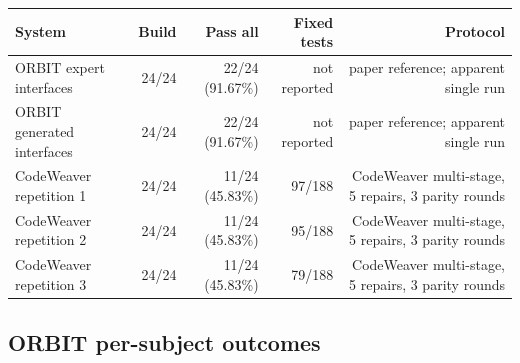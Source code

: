 \documentclass{article}
\begin{document}
\begin{tabular}{lrrrr}
\toprule
System & Build & Pass all & Fixed tests & Protocol \\
\midrule
ORBIT expert interfaces & 24/24 & 22/24 (91.67\%) & not reported & paper reference; apparent single run \\
ORBIT generated interfaces & 24/24 & 22/24 (91.67\%) & not reported & paper reference; apparent single run \\
CodeWeaver repetition 1 & 24/24 & 11/24 (45.83\%) & 97/188 & CodeWeaver multi-stage, 5 repairs, 3 parity rounds \\
CodeWeaver repetition 2 & 24/24 & 11/24 (45.83\%) & 95/188 & CodeWeaver multi-stage, 5 repairs, 3 parity rounds \\
CodeWeaver repetition 3 & 24/24 & 11/24 (45.83\%) & 79/188 & CodeWeaver multi-stage, 5 repairs, 3 parity rounds \\
\bottomrule
\end{tabular}

\subsection*{ORBIT per-subject outcomes}
\end{document}
